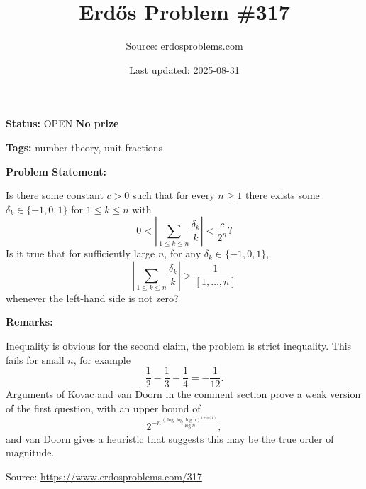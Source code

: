 \documentclass{article}
\title{Erd\H{o}s Problem \#317}
\date{Last updated: 2025-08-31}
\author{Source: erdosproblems.com}
\begin{document}
\maketitle

\noindent\textbf{Status:} OPEN \quad \textbf{No prize}

\noindent\textbf{Tags:} number theory, unit fractions

\medskip
\noindent\textbf{Problem Statement:}

Is there some constant $c>0$ such that for every $n\geq 1$ there exists some $\delta_k\in \{-1,0,1\}$ for $1\leq k\leq n$ with\[0< \left\lvert \sum_{1\leq k\leq n}\frac{\delta_k}{k}\right\rvert < \frac{c}{2^n}?\]Is it true that for sufficiently large $n$, for any $\delta_k\in \{-1,0,1\}$,\[\left\lvert \sum_{1\leq k\leq n}\frac{\delta_k}{k}\right\rvert > \frac{1}{[1,\ldots,n]}\]whenever the left-hand side is not zero?

\bigskip
\noindent\textbf{Remarks:}

Inequality is obvious for the second claim, the problem is strict inequality. This fails for small $n$, for example\[\frac{1}{2}-\frac{1}{3}-\frac{1}{4}=-\frac{1}{12}.\]Arguments of Kovac and van Doorn in the comment section prove a weak version of the first question, with an upper bound of\[2^{-n\frac{(\log\log\log n)^{1+o(1)}}{\log n}},\]and van Doorn gives a heuristic that suggests this may be the true order of magnitude.

\bigskip
\noindent\small{Source: \url{https://www.erdosproblems.com/317}}
\end{document}
